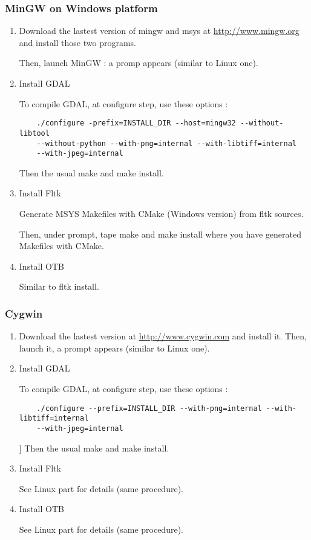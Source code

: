 \subsubsection{MinGW on Windows platform}
\begin{enumerate}

\item Download the lastest version of mingw and msys at \url{http://www.mingw.org} and install those 
	two programs.

	Then, launch MinGW : a promp appears (similar to Linux one).

\item Install GDAL

	To compile GDAL, at configure step, use these options :
\begin{verbatim}
	./configure -prefix=INSTALL_DIR --host=mingw32 --without-libtool 
	--without-python --with-png=internal --with-libtiff=internal
	--with-jpeg=internal
\end{verbatim}
	Then the usual make and make install.

\item Install Fltk

	Generate MSYS Makefiles with CMake (Windows version) from fltk sources.
	
	Then, under prompt, tape make and make install where you have generated Makefiles with CMake.

\item Install OTB

	Similar to fltk install.

\end{enumerate}

\subsubsection{Cygwin}
\begin{enumerate}

\item Download the lastest version at \url{http://www.cygwin.com} and install it.
	Then, launch it, a prompt appears (similar to Linux one).

\item Install GDAL

	To compile GDAL, at configure step, use these options :
\begin{verbatim}
	./configure --prefix=INSTALL_DIR --with-png=internal --with-libtiff=internal
	--with-jpeg=internal
\end{verbatim}]
	Then the usual make and make install.

\item Install Fltk

	See Linux part for details (same procedure).

\item Install OTB

	See Linux part for details (same procedure).
\end{enumerate}

